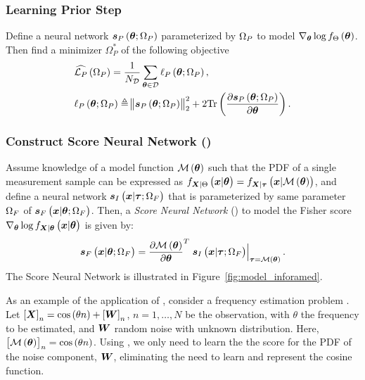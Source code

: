 {\subsubsection{\textbf{Learning Prior Step}}  Define a neural network $\bm{s}_{P}\left(\bm{\theta};\Omega_{P}\right)$  parameterized by $\Omega_{P}$ %
{to {model} $\nabla_{\bm{\theta}}\log f_{\Theta}\left(\bm{\theta}\right)$.} Then
{find a minimizer $\Omega_P^*$ %
of the following objective
}
\begin{align}\label{eq:score_prior_mean}
     &\widehat{\mathcal{L}_{P}}\left(\Omega_{P}\right)=\frac{1}{N_{\mathcal{D}}}\sum_{\bm{\theta}\in\mathcal{D}}\ell_P\left(\bm{\theta};\Omega_{P}\right),\\
     &\ell_P\left(\bm{\theta};\Omega_{P}\right)\triangleq\norm{\bm{s}_{P}\left(\bm{\theta};\Omega_{P}\right)}_2^2+2\mathrm{Tr}\left(\frac{\partial \bm{s}_{P}\left(\bm{\theta};\Omega_{P}\right)}{\partial\bm{\theta}}\right).\nonumber
 \end{align}
\subsubsection{\textbf{Construct \pe{} Score Neural Network (\peac{})}} \label{subsubsec:MoISNN}
Assume knowledge of a model function $\mathcal{M}\left(\bm{\theta}\right)$ such that {the PDF of a single measurement sample can be expressed as} $\probt{\x|\p}{\X|\pr}=\probt{{\x}|\mathcal{M}\brackets{\p}}{\X|\vectorsym{\tau}}$, and define a neural network $\bm{s}_{I}\left(\bm{x}|\bm{\tau}; \Omega_{F}\right)$ that is parameterized by same parameter $\Omega_{F}$ of $\bm{s}_{F}\left(\bm{x}|\bm{\theta};\Omega_{F}\right)$. 
Then, a \emph{\pe{} Score Neural Network} (\peac{}) %
{to {model} the Fisher score $\nabla_{\p}\log\probt{{\x}|\p}{{\X}|\p}$} is given by:
\begin{equation}\label{eq:model_base_score}
\bm{s}_{F}\left({\bm{x}}|\bm{\theta};\Omega_{F}\right)=\frac{\partial\mathcal{M}\left(\bm{\theta}\right)}{\partial\bm{\theta}}^T\left.\bm{s}_{I}\left({\bm{x}}|\bm{\tau};\Omega_{F}\right)\right\vert_{\bm{\tau}=\mathcal{M}\left(\bm{\theta}\right)}.
\end{equation}
The \pe{} Score 
Neural Network is illustrated %
in Figure~\ref{fig:model_inforamed}.

As an example of the application of \peac{}, consider %
{a frequency estimation problem} . 
Let $\squareb{\X}_n=%
{\cos\brackets{ \theta n }}+\squareb{\randomvec{W}}_n$,
{$n= 1, \ldots, N$} 
{be the observation, with $\theta$ the frequency to be estimated, and $\randomvec{W}$   random noise with unknown distribution.} Here, $\left[{\mathcal{M}\left(\bm{\theta}\right)}\right]_n=
{\cos\left(\theta n\right)}$. Using \peac{}, we only need to learn the %
{the score for the PDF of the} noise component, $\randomvec{W}$, {eliminating the need to learn and represent the cosine function}.

}
